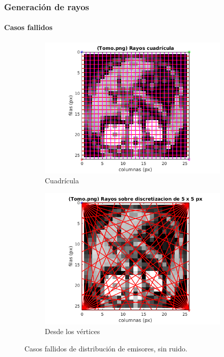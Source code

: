 \documentclass[11pt]{beamer}
\begin{document}
\begin{frame}
    \frametitle{Generación de rayos}
    \framesubtitle{Casos fallidos}
    \begin{figure}[H]
        \centering
        \begin{subfigure}[h]{0.45\textwidth}
            \includegraphics[width=\textwidth]{img/rayosCuadricula.png}
            \caption{Cuadrícula}
            \label{fig:rayoscuadricula}
        \end{subfigure}%
        \hfill
        \begin{subfigure}[h]{0.45\textwidth}
                \includegraphics[width=\textwidth]{img/rayos_vertices.png}
                \caption{Desde los vértices}
                \label{fig:reconstruccion 10 px}
        \end{subfigure}
            
        \caption{Casos fallidos de distribución de emisores, sin ruido.}
    \end{figure}
\end{frame}
\end{document}
